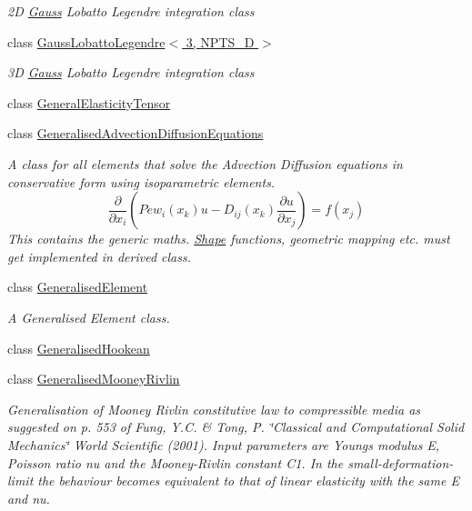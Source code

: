 \begin{DoxyCompactItemize}
\begin{DoxyCompactList}\small\item\em 2D \hyperlink{classoomph_1_1Gauss}{Gauss} Lobatto Legendre integration class \end{DoxyCompactList}\item 
class \hyperlink{classoomph_1_1GaussLobattoLegendre_3_013_00_01NPTS__1D_01_4}{Gauss\+Lobatto\+Legendre$<$ 3, N\+P\+T\+S\+\_\+D $>$}
\begin{DoxyCompactList}\small\item\em 3D \hyperlink{classoomph_1_1Gauss}{Gauss} Lobatto Legendre integration class \end{DoxyCompactList}\item 
class \hyperlink{classoomph_1_1GeneralElasticityTensor}{General\+Elasticity\+Tensor}
\item 
class \hyperlink{classoomph_1_1GeneralisedAdvectionDiffusionEquations}{Generalised\+Advection\+Diffusion\+Equations}
\begin{DoxyCompactList}\small\item\em A class for all elements that solve the Advection Diffusion equations in conservative form using isoparametric elements. \[ \frac{\partial}{\partial x_{i}}\left( Pe w_{i}(x_{k}) u - D_{ij}(x_{k})\frac{\partial u}{\partial x_{j}}\right) = f(x_{j}) \] This contains the generic maths. \hyperlink{classoomph_1_1Shape}{Shape} functions, geometric mapping etc. must get implemented in derived class. \end{DoxyCompactList}\item 
class \hyperlink{classoomph_1_1GeneralisedElement}{Generalised\+Element}
\begin{DoxyCompactList}\small\item\em A Generalised Element class. \end{DoxyCompactList}\item 
class \hyperlink{classoomph_1_1GeneralisedHookean}{Generalised\+Hookean}
\item 
class \hyperlink{classoomph_1_1GeneralisedMooneyRivlin}{Generalised\+Mooney\+Rivlin}
\begin{DoxyCompactList}\small\item\em Generalisation of Mooney Rivlin constitutive law to compressible media as suggested on p. 553 of Fung, Y.\+C. \& Tong, P. \char`\"{}\+Classical and 
\+Computational Solid Mechanics\char`\"{} World Scientific (2001). Input parameters are Young\textquotesingle{}s modulus E, Poisson ratio nu and the Mooney-\/\+Rivlin constant C1. In the small-\/deformation-\/limit the behaviour becomes equivalent to that of linear elasticity with the same E and nu. \end{DoxyCompactList}\item 

\end{DoxyCompactItemize}
